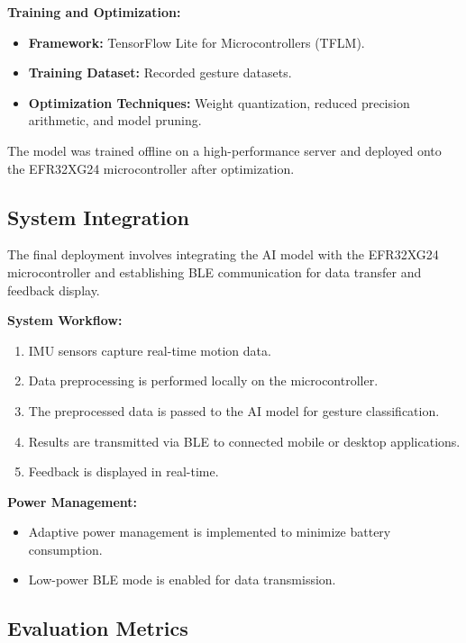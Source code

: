 \documentclass[
  9pt,
  letterpaper,
  abstract,
  titlepage]{scrbook}
\begin{document}
\textbf{Training and Optimization:}

\begin{itemize}
\item
  \textbf{Framework:} TensorFlow Lite for Microcontrollers (TFLM).
\item
  \textbf{Training Dataset:} Recorded gesture datasets.
\item
  \textbf{Optimization Techniques:} Weight quantization, reduced
  precision arithmetic, and model pruning.
\end{itemize}

The model was trained offline on a high-performance server and deployed
onto the EFR32XG24 microcontroller after optimization.

\subsection{System Integration}\label{system-integration}

The final deployment involves integrating the AI model with the
EFR32XG24 microcontroller and establishing BLE communication for data
transfer and feedback display.

\textbf{System Workflow:}

\begin{enumerate}
\def\labelenumi{\arabic{enumi}.}
\item
  IMU sensors capture real-time motion data.
\item
  Data preprocessing is performed locally on the microcontroller.
\item
  The preprocessed data is passed to the AI model for gesture
  classification.
\item
  Results are transmitted via BLE to connected mobile or desktop
  applications.
\item
  Feedback is displayed in real-time.
\end{enumerate}

\textbf{Power Management:}

\begin{itemize}
\item
  Adaptive power management is implemented to minimize battery
  consumption.
\item
  Low-power BLE mode is enabled for data transmission.
\end{itemize}

\subsection{Evaluation Metrics}\label{evaluation-metrics}
\end{document}
